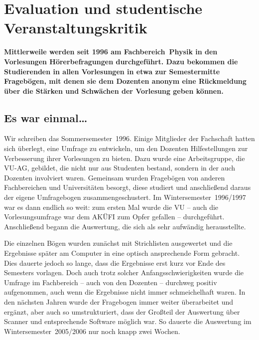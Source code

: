 \section{Evaluation und studentische Veranstaltungskritik}
\vspace{-3ex}
\begin{multicols}{2}
\fibelspacingsubsubsection[subsection]

\textbf{Mittlerweile werden seit 1996 am Fachbereich~Physik in den Vorlesungen Hörerbefragungen durchgeführt.
Dazu bekommen die Studierenden in allen Vorlesungen in etwa zur Semestermitte Fragebögen, mit denen sie dem Dozenten anonym eine Rückmeldung über die Stärken und Schwächen der Vorlesung geben können.}

\subsection{Es war einmal\dots}
Wir schreiben das Sommersemester~1996.
Einige Mitglieder der Fachschaft hatten sich überlegt, eine Umfrage zu entwickeln, um den Dozenten Hilfestellungen zur Verbesserung ihrer Vorlesungen zu bieten.
Dazu wurde eine Arbeitsgruppe, die VU-AG, gebildet, die nicht nur aus Studenten bestand, sondern in der auch Dozenten involviert waren.
Gemeinsam wurden Fragebögen von anderen Fachbereichen und Universitäten besorgt, diese studiert und anschließend daraus der eigene Umfragebogen zusammengeschustert.
Im Wintersemester~1996/1997 war es dann endlich so weit: zum ersten Mal wurde die VU -- auch die Vorlesungsumfrage war dem AKÜFI zum Opfer gefallen -- durchgeführt.
Anschließend begann die Auswertung, die sich als sehr aufwändig herausstellte.

Die einzelnen Bögen wurden zunächst mit Strichlisten ausgewertet und die Ergebnisse später am Computer in eine optisch ansprechende Form gebracht.
Dies dauerte jedoch so lange, dass die Ergebnisse erst kurz vor Ende des Semesters vorlagen.
Doch auch trotz solcher Anfangsschwierigkeiten wurde die Umfrage im Fachbereich -- auch von den Dozenten -- durchweg positiv aufgenommen, auch wenn die Ergebnisse nicht immer schmeichelhaft waren.
In den nächsten Jahren wurde der Fragebogen immer weiter überarbeitet und ergänzt, aber auch so umstrukturiert, dass der Großteil der Auswertung über Scanner und entsprechende Software möglich war.
So dauerte die Auswertung im Wintersemester~2005/2006 nur noch knapp zwei Wochen.


\end{multicols}
